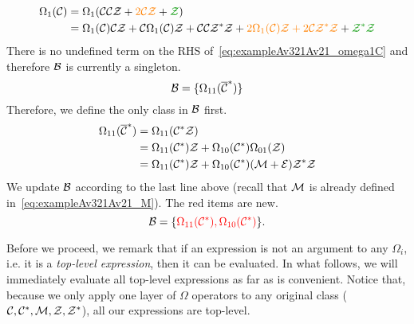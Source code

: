 \documentclass[12pt, a4paper, twoside]{report}
\begin{document}
\begin{align}
  \begin{aligned}
    \Omega_1(\C) &= \Omega_1(\C\C\Z + \textcolor{orange}{2\C\Z} + \textcolor{green}{\Z})\\
    &= \Omega_1(\C)\C\Z + \C\Omega_1(\C)\Z + \C\C\Z^*\Z + \textcolor{orange}{2\Omega_1(\C)\Z + 2\C\Z^*\Z} + \textcolor{green}{\Z^*\Z}
  \end{aligned}
  \label{eq:exampleAv321Av21_omega1C}
\end{align}
There is no undefined term on the RHS of~\eqref{eq:exampleAv321Av21_omega1C} and therefore $\mathcal{B}$ is currently a singleton.
$$\mathcal{B} = \{\Omega_{11}(\overline{\mathcal{C}}^*)\}$$
Therefore, we define the only class in $\mathcal{B}$ first.
\begin{align}
  \begin{aligned}
  \Omega_{11}(\overline{\mathcal{C}}^*) &= \Omega_{11}(\mathcal{C}^*\mathcal{Z})\\
                         &= \Omega_{11}(\mathcal{C}^*)\mathcal{Z} + \Omega_{10}(\mathcal{C}^*)\Omega_{01}(\mathcal{Z})\\
                         &= \Omega_{11}(\mathcal{C}^*)\mathcal{Z} + \Omega_{10}(\mathcal{C}^*)(\mathcal{M}+\mathcal{E})\mathcal{Z}^*\mathcal{Z}\\
                       \end{aligned}
  \label{eq:omega11barCstar}
\end{align}
We update $\mathcal{B}$ according to the last line above (recall that $\mathcal{M}$ is already defined in~\eqref{eq:exampleAv321Av21_M}). The red items are new.
$$\mathcal{B} = \{\textcolor{red}{\Omega_{11}(\mathcal{C}^*), \Omega_{10}(\mathcal{C}^*)}\}.$$

Before we proceed, we remark that if an expression is not an argument to any $\Omega_i$, i.e. it is a \emph{top-level expression}, then it can be evaluated. In what follows, we will immediately evaluate all top-level expressions as far as is convenient. Notice that, because we only apply one layer of $\Omega$ operators to any original class ($\mathcal{C},\mathcal{C}^*,\mathcal{M},\mathcal{Z},\mathcal{Z}^*$), all our expressions are top-level.
\end{document}
